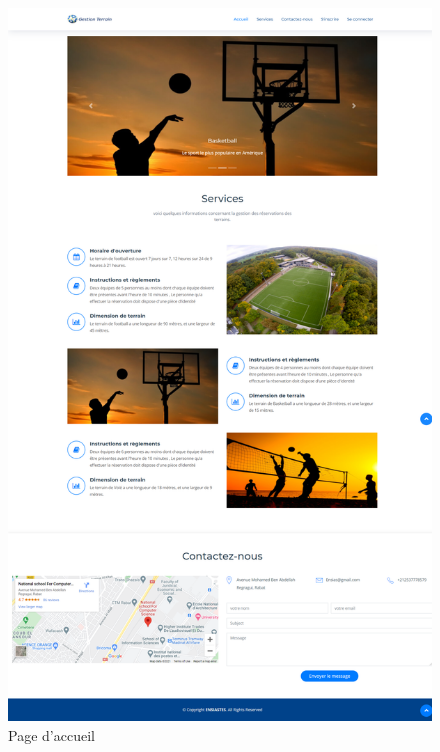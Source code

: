 \documentclass[a4paper]{report}
\begin{document}
\begin{spacing}{2}
\begin{figure}[!ht]
\begin{center}
\includegraphics[width=14cm]{Screenshots/Acceuil.png}
\end{center}
\caption[Page d'accueil]{Page d'accueil}
\end{figure}

\cleardoublepage



\end{spacing}
\end{document}
